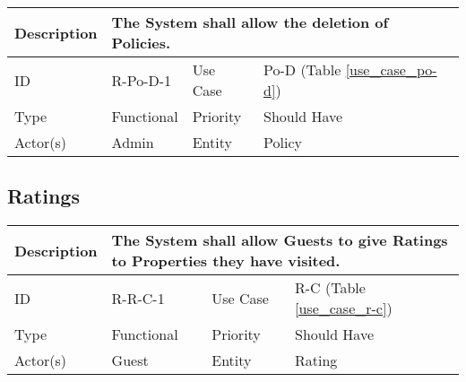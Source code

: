\begin{tabular}{|p{1.5cm}|p{1.5cm}|p{1.5cm}|p{1.5cm}|p{1.5cm}|p{1.5cm}|p{1.5cm}|p{1.5cm}|p{1.5cm}|p{1.5cm}|p{1.5cm}|p{1.5cm}|}
    \hline
    \multicolumn{2}{|o|}{Description} & \multicolumn{10}{p{12.5cm}|}{The System shall allow the deletion of Policies.} \\ \hline
    \multicolumn{2}{|o|}{ID}          & \multicolumn{4}{n}{R-Po-D-1}           & \multicolumn{2}{|o|}{Use Case}    & \multicolumn{4}{n|}{Po-D (Table \ref{use_case_po-d})} \\ \hline
    \multicolumn{2}{|o|}{Type}        & \multicolumn{4}{n}{Functional}         & \multicolumn{2}{|o|}{Priority}    & \multicolumn{4}{n|}{Should Have}  \\ \hline
    \multicolumn{2}{|o|}{Actor(s)}    & \multicolumn{4}{n}{Admin}              & \multicolumn{2}{|o|}{Entity}      & \multicolumn{4}{n|}{Policy} \\ \hline
\end{tabular}

\subsection{Ratings}

\begin{tabular}{|p{1.5cm}|p{1.5cm}|p{1.5cm}|p{1.5cm}|p{1.5cm}|p{1.5cm}|p{1.5cm}|p{1.5cm}|p{1.5cm}|p{1.5cm}|p{1.5cm}|p{1.5cm}|}
    \hline
    \multicolumn{2}{|o|}{Description} & \multicolumn{10}{p{12.5cm}|}{The System shall allow Guests to give Ratings to Properties they have visited.} \\ \hline
    \multicolumn{2}{|o|}{ID}          & \multicolumn{4}{n}{R-R-C-1}            & \multicolumn{2}{|o|}{Use Case}    & \multicolumn{4}{n|}{R-C (Table \ref{use_case_r-c})} \\ \hline
    \multicolumn{2}{|o|}{Type}        & \multicolumn{4}{n}{Functional}         & \multicolumn{2}{|o|}{Priority}    & \multicolumn{4}{n|}{Should Have}  \\ \hline
    \multicolumn{2}{|o|}{Actor(s)}    & \multicolumn{4}{n}{Guest}              & \multicolumn{2}{|o|}{Entity}      & \multicolumn{4}{n|}{Rating} \\ \hline
\end{tabular}

